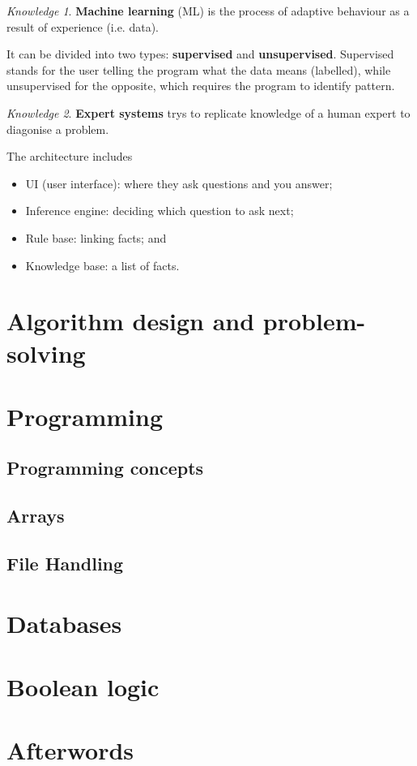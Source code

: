 \documentclass[8pt]{article}
\theoremstyle{remark}
\newtheorem{knowledge}{Knowledge}[subsection]
\begin{document}
            \begin{knowledge}
                \textbf{Machine learning} (ML) is the process of adaptive behaviour as a result of experience (i.e. data).

                It can be divided into two types: \textbf{supervised} and \textbf{unsupervised}. Supervised stands for the user telling the program what the data means (labelled), while unsupervised for the opposite, which requires the program to identify pattern.
            \end{knowledge}

            \begin{knowledge}
                \textbf{Expert systems} trys to replicate knowledge of a human expert to diagonise a problem.

                The architecture includes
                \begin{itemize}
                    \item UI (user interface): where they ask questions and you answer;
                    \item Inference engine: deciding which question to ask next;
                    \item Rule base: linking facts; and
                    \item Knowledge base: a list of facts.
                \end{itemize}
            \end{knowledge}
            
    \section{Algorithm design and problem-solving}

    \section{Programming}
        \subsection{Programming concepts}
        
        \subsection{Arrays}

        \subsection{File Handling}
    \section{Databases}

    \section{Boolean logic}

    \section*{Afterwords}
        
\end{document}
